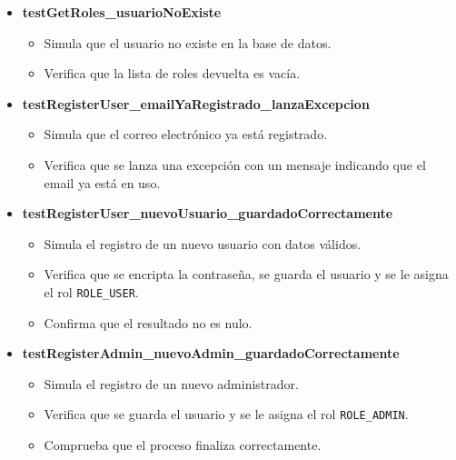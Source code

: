 \begin{itemize}
\begin{itemize}
        \item \textbf{testGetRoles\_usuarioNoExiste}
          \begin{itemize}
            \item Simula que el usuario no existe en la base de datos.
            \item Verifica que la lista de roles devuelta es vacía.
          \end{itemize}
        \item \textbf{testRegisterUser\_emailYaRegistrado\_lanzaExcepcion}
          \begin{itemize}
            \item Simula que el correo electrónico ya está registrado.
            \item Verifica que se lanza una excepción con un mensaje indicando que el email ya está en uso.
          \end{itemize}

        \item \textbf{testRegisterUser\_nuevoUsuario\_guardadoCorrectamente}
          \begin{itemize}
            \item Simula el registro de un nuevo usuario con datos válidos.
            \item Verifica que se encripta la contraseña, se guarda el usuario y se le asigna el rol \texttt{ROLE\_USER}.
            \item Confirma que el resultado no es nulo.
          \end{itemize}

        \item \textbf{testRegisterAdmin\_nuevoAdmin\_guardadoCorrectamente}
          \begin{itemize}
            \item Simula el registro de un nuevo administrador.
            \item Verifica que se guarda el usuario y se le asigna el rol \texttt{ROLE\_ADMIN}.
            \item Comprueba que el proceso finaliza correctamente.
          \end{itemize}


\end{itemize}
\end{itemize}
